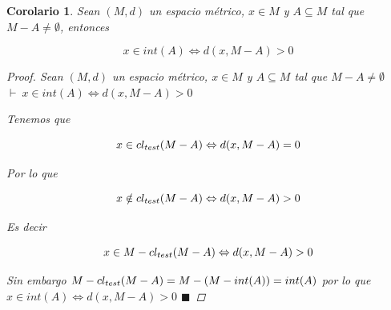 \documentclass[oneside]{book} %
\theoremstyle{Teorema}
\newtheorem{Corolario}[Definicion]{Corolario}
\theoremstyle{Ejemplos}
\theoremstyle{[Obs]}
\def \test {test}
\newcommand{\cerradura}[2][\test]{\ifx \test #1 {\overline{#2}} \else {cl_{#1}(#2)} \fi} %
\renewcommand{\{}{\left\lbrace} %
\renewcommand{\}}{\right\rbrace} %
\renewcommand{\sc}{\subseteq} %
\renewcommand{\qed}{$\blacksquare$} %
\newcommand{\pd}{$\vdash\ $} %
\begin{document}
			\begin{Corolario}\setlength{\parindent}{0em}
			
				Sean $(M, d)$ un espacio métrico, $x \in M$ y $A \sc M$ tal que $M - A \neq \emptyset$, entonces 

				\[ x \in int(A) \Leftrightarrow d(x, M - A) > 0 \]

				\begin{proof}
					
					Sean $(M, d)$ un espacio métrico, $x \in M$ y $A \sc M$ tal que $M - A \neq \emptyset$ \\ 
					\pd $x \in int(A) \Leftrightarrow d(x, M - A) > 0$

					Tenemos que 
					
					\[ x \in \cerradura{M - A} \Leftrightarrow d(x, M - A) = 0 \]

					Por lo que 

					\[ x \notin \cerradura{M - A} \Leftrightarrow d(x, M - A) > 0 \]

					Es decir 

					\[ x \in M - \cerradura{M - A} \Leftrightarrow d(x, M - A) > 0 \]

					Sin embargo $M - \cerradura{M - A} = M - (M - int(A)) = int(A)$ por lo que $x \in int(A) \Leftrightarrow d(x, M - A) > 0$ \qed
					
				\end{proof}
			
			\end{Corolario}
\end{document}
